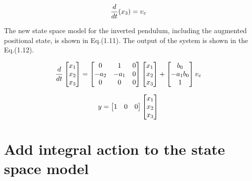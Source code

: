 \documentclass[11pt]{report}
\begin{document}
\begin{equation}
\frac{d}{dt}(x\textsubscript{3}) = v\textsubscript{c}
\end{equation}

The new state space model for the inverted pendulum, including the augmented positional state, is shown in Eq.(1.11). The output of the system is shown in the Eq.(1.12). 

\begin{equation}
\frac{d}{dt}
\begin{bmatrix}
x\textsubscript{1}\\
x\textsubscript{2}\\
x\textsubscript{3}\\
\end{bmatrix}
=
\begin{bmatrix}
0 & 1 & 0\\
-a\textsubscript{2} & -a\textsubscript{1} & 0\\
0 & 0 & 0\\
\end{bmatrix}
\begin{bmatrix}
x\textsubscript{1}\\
x\textsubscript{2}\\
x\textsubscript{3}\\
\end{bmatrix}
+ 
\begin{bmatrix}
b\textsubscript{0}\\
-a\textsubscript{1}b\textsubscript{0}\\
1\\
\end{bmatrix}
v\textsubscript{c}
\end{equation}

\begin{equation}
y 
=
\begin{bmatrix}
1 & 0 & 0\\
\end{bmatrix}
\begin{bmatrix}
x\textsubscript{1}\\
x\textsubscript{2}\\
x\textsubscript{3}\\
\end{bmatrix}
\end{equation}

\section{Add integral action to the state space model}
\end{document}
